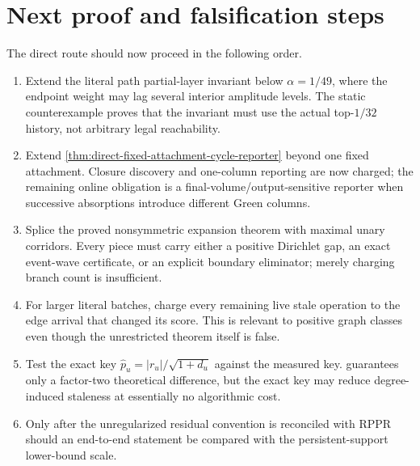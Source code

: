 \section{Next proof and falsification steps}
\label{sec:direct-next}

The direct route should now proceed in the following order.

\begin{enumerate}[leftmargin=*]
 \item Extend the literal path partial-layer invariant below
 $\alpha=1/49$, where the endpoint weight may lag several interior amplitude
 levels.  The static counterexample proves that the invariant must use the
 actual top-$1/32$ history, not arbitrary legal reachability.
 \item Extend \cref{thm:direct-fixed-attachment-cycle-reporter} beyond one
 fixed attachment.  Closure discovery and one-column reporting are now
 charged; the remaining online obligation is a final-volume/output-sensitive
 reporter when successive absorptions introduce different Green columns.
 \item Splice the proved nonsymmetric expansion theorem with maximal unary
 corridors.  Every piece must carry either a positive Dirichlet gap, an
 exact event-wave certificate, or an explicit boundary eliminator; merely
 charging branch count is insufficient.
 \item For larger literal batches, charge every remaining live stale
 operation to the edge arrival that changed its score.  This is relevant to
 positive graph classes even though the unrestricted theorem itself is
 false.
 \item Test the exact key $\widehat p_u=|r_u|/\sqrt{1+d_u}$ against the
 measured key.  guarantees only a factor-two
 theoretical difference, but the exact key may reduce degree-induced
 staleness at essentially no algorithmic cost.
 \item Only after the unregularized residual convention is reconciled with
 RPPR should an end-to-end statement be compared with the persistent-support
 lower-bound scale.
\end{enumerate}
